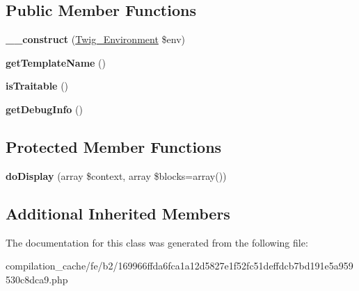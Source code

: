 \subsection*{Public Member Functions}
\begin{DoxyCompactItemize}
\item 
\hypertarget{class_____twig_template__feb2169966ffda6fca1a12d5827e1f52fc51deffdcb7bd191e5a959530c8dca9_a4f8326243132c1450a81e0a817aa1be7}{}{\bfseries \+\_\+\+\_\+construct} (\hyperlink{class_twig___environment}{Twig\+\_\+\+Environment} \$env)\label{class_____twig_template__feb2169966ffda6fca1a12d5827e1f52fc51deffdcb7bd191e5a959530c8dca9_a4f8326243132c1450a81e0a817aa1be7}

\item 
\hypertarget{class_____twig_template__feb2169966ffda6fca1a12d5827e1f52fc51deffdcb7bd191e5a959530c8dca9_a621a3ccd148ed8b9e937da6959c98f39}{}{\bfseries get\+Template\+Name} ()\label{class_____twig_template__feb2169966ffda6fca1a12d5827e1f52fc51deffdcb7bd191e5a959530c8dca9_a621a3ccd148ed8b9e937da6959c98f39}

\item 
\hypertarget{class_____twig_template__feb2169966ffda6fca1a12d5827e1f52fc51deffdcb7bd191e5a959530c8dca9_aa9eb89be270f6afc256ef5e272b78a63}{}{\bfseries is\+Traitable} ()\label{class_____twig_template__feb2169966ffda6fca1a12d5827e1f52fc51deffdcb7bd191e5a959530c8dca9_aa9eb89be270f6afc256ef5e272b78a63}

\item 
\hypertarget{class_____twig_template__feb2169966ffda6fca1a12d5827e1f52fc51deffdcb7bd191e5a959530c8dca9_abd0ecb0136f4228db2bd963bfc1e20d7}{}{\bfseries get\+Debug\+Info} ()\label{class_____twig_template__feb2169966ffda6fca1a12d5827e1f52fc51deffdcb7bd191e5a959530c8dca9_abd0ecb0136f4228db2bd963bfc1e20d7}

\end{DoxyCompactItemize}
\subsection*{Protected Member Functions}
\begin{DoxyCompactItemize}
\item 
\hypertarget{class_____twig_template__feb2169966ffda6fca1a12d5827e1f52fc51deffdcb7bd191e5a959530c8dca9_adb62b7c226e07d30f836ed16158d924f}{}{\bfseries do\+Display} (array \$context, array \$blocks=array())\label{class_____twig_template__feb2169966ffda6fca1a12d5827e1f52fc51deffdcb7bd191e5a959530c8dca9_adb62b7c226e07d30f836ed16158d924f}

\end{DoxyCompactItemize}
\subsection*{Additional Inherited Members}


The documentation for this class was generated from the following file\+:\begin{DoxyCompactItemize}
\item 
compilation\+\_\+cache/fe/b2/169966ffda6fca1a12d5827e1f52fc51deffdcb7bd191e5a959530c8dca9.\+php\end{DoxyCompactItemize}
